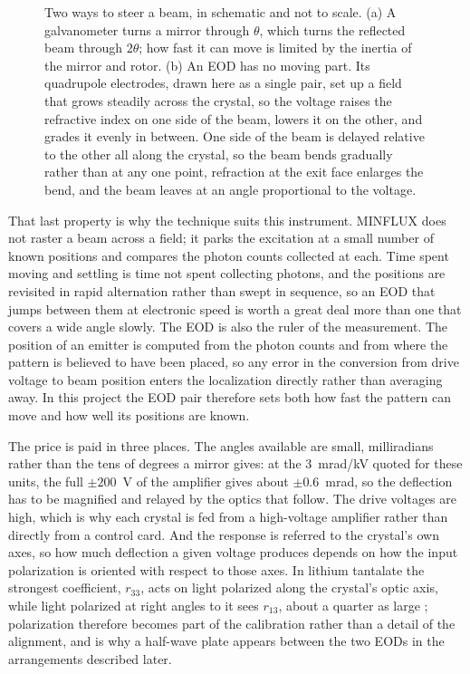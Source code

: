 \documentclass{article}
\begin{document}
\begin{figure}[!htbp]
\begin{tikzpicture}[>=stealth, font=\small]
    \end{tikzpicture}
    \caption{Two ways to steer a beam, in schematic and not to scale. (a) A galvanometer turns a
    mirror through $\theta$, which turns the reflected beam through $2\theta$; how fast it can move
    is limited by the inertia of the mirror and rotor. (b) An EOD has no moving part. Its quadrupole
    electrodes, drawn here as a single pair, set up a field that grows steadily across the crystal,
    so the voltage raises the refractive index on one side of the beam, lowers it on the other, and
    grades it evenly in between. One side of the beam is delayed relative to the other all along
    the crystal, so the beam bends gradually rather than at any one point, refraction at the exit
    face enlarges the bend, and the beam leaves at an angle proportional to the voltage.}
    \label{fig:eod-concept}
\end{figure}

That last property is why the technique suits this instrument. MINFLUX does not raster a beam
across a field; it parks the excitation at a small number of known positions and compares the
photon counts collected at each. Time spent moving and settling is time not spent collecting
photons, and the positions are revisited in rapid alternation rather than swept in sequence, so an
EOD that jumps between them at electronic speed is worth a great deal more than one that
covers a wide angle slowly. The EOD is also the ruler of the measurement. The position of an
emitter is computed from the photon counts and from where the pattern is believed to have been
placed, so any error in the conversion from drive voltage to beam position enters the
localization directly rather than averaging away. In this project the EOD pair therefore sets
both how fast the pattern can move and how well its positions are known.

The price is paid in three places. The angles available are small, milliradians rather than the
tens of degrees a mirror gives: at the 3~mrad/kV quoted for these units, the full $\pm200$~V of
the amplifier gives about $\pm0.6$~mrad, so the deflection has to be magnified and relayed by the
optics that follow. The drive voltages are high, which is why each crystal is fed from a high-voltage
amplifier rather than directly from a control card. And the response is referred to the crystal's
own axes, so how much deflection a given voltage produces depends on how the input polarization
is oriented with respect to those axes. In lithium tantalate the strongest coefficient, $r_{33}$,
acts on light polarized along the crystal's optic axis, while light polarized at right angles to
it sees $r_{13}$, about a quarter as large
\cite{yarivPhotonicsOpticalElectronics2007,cassonElectroopticCoefficientsLithium2004};
polarization therefore becomes part of the calibration rather than
a detail of the alignment, and is why a half-wave plate appears between the two EODs in the
arrangements described later.
\end{document}

